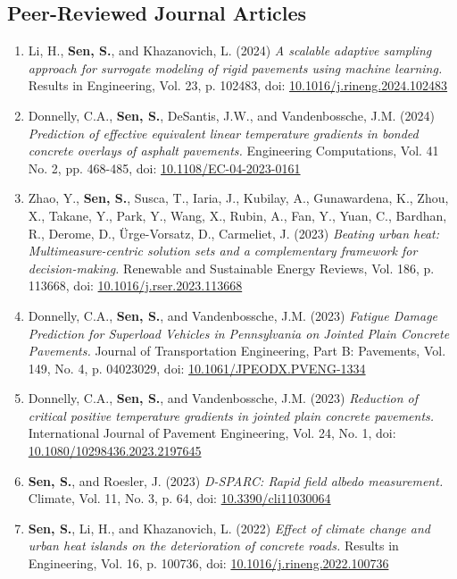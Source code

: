 \documentclass[12pt]{article}
\begin{document}
\subsection*{Peer-Reviewed Journal Articles}
\begin{enumerate}[label=(J\arabic*)]
	\item Li, H., \textbf{Sen, S.}, and Khazanovich, L. (2024) \textit{A scalable adaptive sampling approach for surrogate modeling of rigid pavements using machine learning.} Results in Engineering, Vol. 23, p. 102483, doi: \href{https://doi.org/10.1016/j.rineng.2024.102483}{10.1016/j.rineng.2024.102483}
	\item Donnelly, C.A., \textbf{Sen, S.}, DeSantis, J.W., and Vandenbossche, J.M. (2024) \textit{Prediction of effective equivalent linear temperature gradients in bonded concrete overlays of asphalt pavements.}  Engineering Computations, Vol. 41 No. 2, pp. 468-485, doi: \href{https://doi.org/10.1108/EC-04-2023-0161}{10.1108/EC-04-2023-0161}
	\item Zhao, Y., \textbf{Sen, S.}, Susca, T., Iaria, J., Kubilay, A., Gunawardena, K., Zhou, X., Takane, Y., Park, Y., Wang, X., Rubin, A., Fan, Y., Yuan, C., Bardhan, R., Derome, D., Ürge-Vorsatz, D., Carmeliet, J. (2023) \textit{Beating urban heat: Multimeasure-centric solution sets and a complementary framework for decision-making.} Renewable and Sustainable Energy Reviews, Vol. 186, p. 113668, doi: \href{https://doi.org/10.1016/j.rser.2023.113668}{10.1016/j.rser.2023.113668}
	\item Donnelly, C.A., \textbf{Sen, S.}, and Vandenbossche, J.M. (2023) \textit{Fatigue Damage Prediction for Superload Vehicles in Pennsylvania on Jointed Plain Concrete Pavements.}  Journal of Transportation Engineering, Part B: Pavements, Vol. 149, No. 4, p. 04023029, doi: \href{https://doi.org/10.1061/JPEODX.PVENG-1334}{10.1061/JPEODX.PVENG-1334}
	\item Donnelly, C.A., \textbf{Sen, S.}, and Vandenbossche, J.M. (2023) \textit{Reduction of critical positive temperature gradients in jointed plain concrete pavements.}  International Journal of Pavement Engineering, Vol. 24, No. 1, doi: \href{https://doi.org/10.1080/10298436.2023.2197645}{10.1080/10298436.2023.2197645}
	\item \textbf{Sen, S.}, and Roesler, J. (2023) \textit{D-SPARC: Rapid field albedo measurement.}  Climate, Vol. 11, No. 3, p. 64, doi: \href{https://doi.org/10.3390/cli11030064}{10.3390/cli11030064}
	\item \textbf{Sen, S.}, Li, H., and Khazanovich, L. (2022) \textit{Effect of climate change and urban heat islands on the deterioration of concrete roads.} Results in Engineering, Vol. 16, p. 100736, doi: \href{https://doi.org/10.1016/j.rineng.2022.100736}{10.1016/j.rineng.2022.100736}

\end{enumerate}
\end{document}
